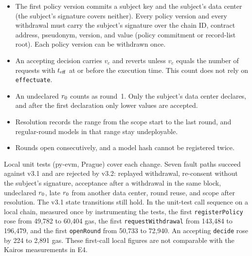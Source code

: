 \begin{itemize}
\item The first policy version commits a subject key and the subject's data center (the subject's signature covers neither). Every policy version and every withdrawal must carry the subject's signature over the chain ID, contract address, pseudonym, version, and value (policy commitment or record-list root). Each policy version can be withdrawn once.
\item An accepting decision carries $v_c$ and reverts unless $v_c$ equals the number of requests with $t_{\mathrm{eff}}$ at or before the execution time. This count does not rely on \texttt{effectuate}.
\item An undeclared $r_0$ counts as round~1. Only the subject's data center declares, and after the first declaration only lower values are accepted.
\item Resolution records the range from the scope start to the last round, and regular-round models in that range stay undeployable.
\item Rounds open consecutively, and a model hash cannot be registered twice.
\end{itemize}
Local unit tests (py-evm, Prague) cover each change. Seven fault paths succeed against v3.1 and are rejected by v3.2: replayed withdrawal, re-consent without the subject's signature, acceptance after a withdrawal in the same block, undeclared $r_0$, late $r_0$ from another data center, round reuse, and scope after resolution. The v3.1 state transitions still hold. In the unit-test call sequence on a local chain, measured once by instrumenting the tests, the first \texttt{registerPolicy} rose from 49,782 to 60,404 gas, the first \texttt{requestWithdrawal} from 143,484 to 196,479, and the first \texttt{openRound} from 50,733 to 72,940. An accepting \texttt{decide} rose by 224 to 2,891 gas. These first-call local figures are not comparable with the Kairos measurements in E4.


